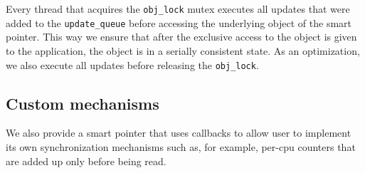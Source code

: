 Every thread that acquires the {\tt obj\_lock} mutex executes all updates that were added to the {\tt update\_queue} before accessing the underlying object of the smart pointer. This way we ensure that after the exclusive access to the object is given to the application, the object is in a serially consistent state. As an optimization, we also execute all updates before releasing the {\tt obj\_lock}.

\subsection{Custom mechanisms}

We also provide a smart pointer that uses callbacks to allow user to implement its own synchronization mechanisms such as, for example, per-cpu counters that are added up only before being read.
